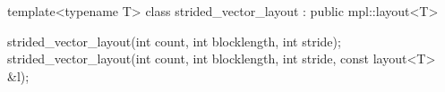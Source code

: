 template<typename T>
class strided_vector_layout : public mpl::layout<T>

strided_vector_layout(int count, int blocklength, int stride);
strided_vector_layout(int count, int blocklength, int stride, const layout<T> &l);


